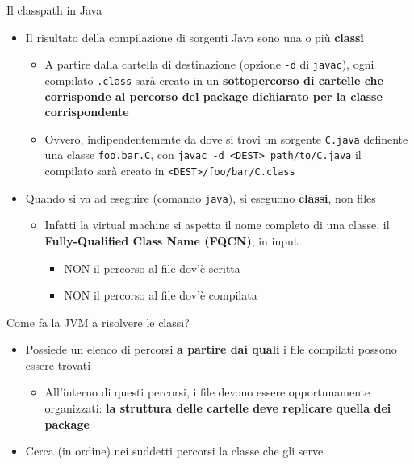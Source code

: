 \documentclass[xcolor=dvipsnames,presentation]{beamer}
\begin{document}
\begin{frame}[allowframebreaks]{Il classpath in Java}
    \begin{itemize}
        \item Il risultato della compilazione di sorgenti Java sono una o più \textbf{classi}
        	\begin{itemize}
        	\item A partire dalla cartella di destinazione (opzione \texttt{-d} di \texttt{javac}), ogni compilato \texttt{.class} sarà creato in un \textbf{sottopercorso di cartelle che corrisponde al percorso del package dichiarato per la classe corrispondente}
        	\item Ovvero, indipendentemente da dove si trovi un sorgente \texttt{C.java} definente una classe \texttt{foo.bar.C}, con \texttt{javac -d <DEST> path/to/C.java} il compilato sarà creato in \texttt{<DEST>/foo/bar/C.class}
        	\end{itemize}
        \item Quando si va ad eseguire (comando \texttt{java}), si eseguono \textbf{classi}, non files
        \begin{itemize}
            \item Infatti la virtual machine si aspetta il nome completo di una classe, il \textbf{Fully-Qualified Class Name (FQCN)}, in input
            \begin{itemize}
                \item NON il percorso al file dov'è scritta
                \item NON il percorso al file dov'è compilata
            \end{itemize}
        \end{itemize}
    \end{itemize}
    \begin{block}{Come fa la JVM a risolvere le classi?}
        \begin{itemize}
            \item Possiede un elenco di percorsi \textbf{a partire dai quali} i file compilati possono essere trovati
            \begin{itemize}
                \item All'interno di questi percorsi, i file devono essere opportunamente organizzati: \textbf{la struttura delle cartelle deve replicare quella dei package}
            \end{itemize}
            \item Cerca (in ordine) nei suddetti percorsi la classe che gli serve

\end{itemize}
\end{block}
\end{frame}
\end{document}
